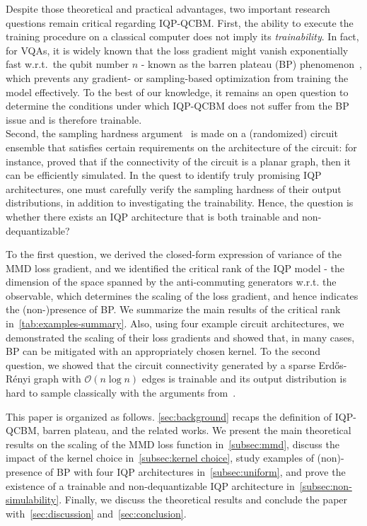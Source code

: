 \documentclass{article}
\theoremstyle{plain}
\theoremstyle{definition}
\theoremstyle{remark}
\begin{document}
Despite those theoretical and practical advantages, two important research questions remain critical regarding IQP-QCBM. First, the ability to execute the training procedure on a classical computer does not imply its \emph{trainability}. In fact, for VQAs, it is widely known that the loss gradient might vanish exponentially fast w.r.t.~the qubit number $n$ - known as the barren plateau (BP) phenomenon~\cite{mcclean18,Cerezo21,Holmes22,Larocca25}, which prevents any gradient- or sampling-based optimization from training the model effectively. To the best of our knowledge, it remains an open question to determine the conditions under which IQP-QCBM does not suffer from the BP issue and is therefore trainable. \\
Second, the sampling hardness argument~\cite{Bremner10,Bremner16,Bremner17} is made on a (randomized) circuit ensemble that satisfies certain requirements on the architecture of the circuit: for instance, \citet{Fujii17} proved that if the connectivity of the circuit is a planar graph, then it can be efficiently simulated. In the quest to identify truly promising IQP architectures, one must carefully verify the sampling hardness of their output distributions, in addition to investigating the trainability. Hence, the question is whether there exists an IQP architecture that is both trainable and non-dequantizable?

To the first question, we derived the closed-form expression of variance of the MMD loss gradient, and we identified the critical rank of the IQP model - the dimension of the space spanned by the anti-commuting generators w.r.t. the observable, which determines the scaling of the loss gradient, and hence indicates the (non-)presence of BP. We summarize the main results of the critical rank in~\cref{tab:examples-summary}. Also, using four example circuit architectures, we demonstrated the scaling of their loss gradients and showed that, in many cases, BP can be mitigated with an appropriately chosen kernel. To the second question, we showed that the circuit connectivity generated by a sparse Erd\H os-R\'enyi graph with $\mathcal{O}(n\log n)$ edges is trainable and its output distribution is hard to sample classically with the arguments from~\cite{Bremner17}.

This paper is organized as follows. \cref{sec:background} recaps the definition of IQP-QCBM, barren plateau, and the related works. We present the main theoretical results on the scaling of the MMD loss function in~\cref{subsec:mmd}, discuss the impact of the kernel choice in~\cref{subsec:kernel choice}, study examples of (non)-presence of BP with four IQP architectures in~\cref{subsec:uniform}, 
and prove the existence of a trainable and non-dequantizable IQP architecture in~\cref{subsec:non-simulability}. Finally, we discuss the theoretical results and conclude the paper with~\cref{sec:discussion} and~\cref{sec:conclusion}.
\end{document}
